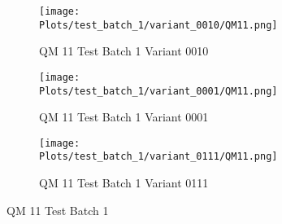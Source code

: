 \documentclass{DissertateFigs}
\begin{document}
\begin{figure}[t!]
\medskip

    \begin{subfigure}{0.47\textwidth}
    \texttt{[image: Plots/test\_batch\_1/variant\_0010/QM11.png]}
    \caption{QM 11 Test Batch 1 Variant 0010}
    \end{subfigure}
    \begin{subfigure}{0.47\textwidth}
    \texttt{[image: Plots/test\_batch\_1/variant\_0001/QM11.png]}
    \caption{QM 11 Test Batch 1 Variant 0001}
    \end{subfigure}

\medskip

    \begin{subfigure}{0.47\textwidth}
    \texttt{[image: Plots/test\_batch\_1/variant\_0111/QM11.png]}
    \caption{QM 11 Test Batch 1 Variant 0111}
    \end{subfigure}
\caption{QM 11 Test Batch 1}
    \end{figure}
\clearpage
\end{document}
